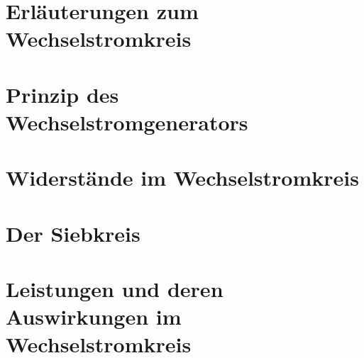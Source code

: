 \section{Erläuterungen zum Wechselstromkreis}				\label{sec:Erlaeuterungen}





\section{Prinzip des Wechselstromgenerators}				\label{sec:Generator}





\section{Widerstände im Wechselstromkreis}					\label{sec:Widerstaende}





\section{Der Siebkreis}										\label{sec:Siebkreis}





\section[Leistungen im Wechselstromkreis]{Leistungen und deren Auswirkungen im Wechselstromkreis}	\label{sec:Leistungen}

